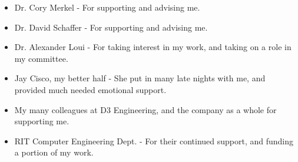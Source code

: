 %
%
%


\frontmatter


\begin{acknowledgments}
\begin{itemize}
    \item Dr. Cory Merkel - For supporting and advising me.
    \item Dr. David Schaffer - For supporting and advising me.
    \item Dr. Alexander Loui - For taking interest in my work, and taking on a role in my committee.
    \item Jay Cisco, my better half - She put in many late nights with me, and provided much needed emotional support.
    \item My many colleagues at D3 Engineering, and the company as a whole for supporting me.
    \item RIT Computer Engineering Dept. - For their continued support, and funding a portion of my work.
\end{itemize}
\end{acknowledgments} 




